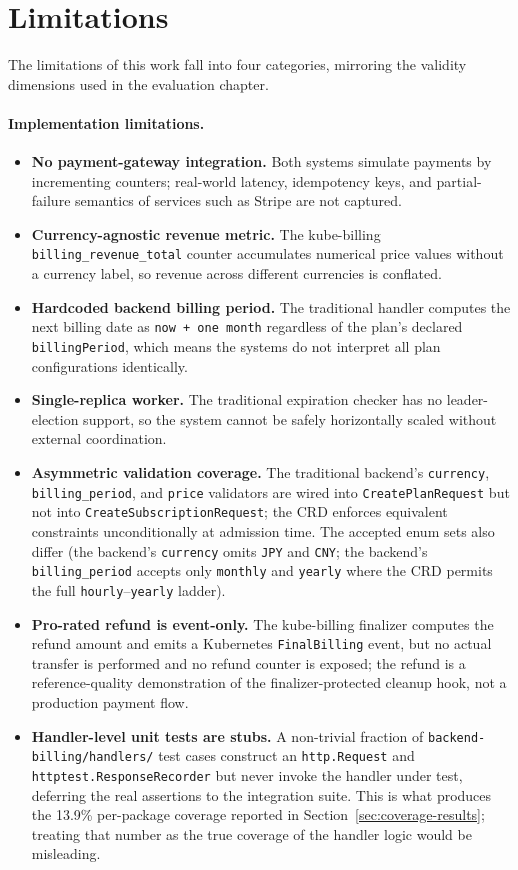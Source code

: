 \section{Limitations}\label{sec:limitations}

The limitations of this work fall into four categories, mirroring the validity dimensions used in the evaluation chapter.

\paragraph{Implementation limitations.}
\begin{itemize}
    \item \textbf{No payment-gateway integration.} Both systems simulate payments by incrementing counters; real-world latency, idempotency keys, and partial-failure semantics of services such as Stripe are not captured.
    \item \textbf{Currency-agnostic revenue metric.} The kube-billing \texttt{billing\_revenue\_total} counter accumulates numerical price values without a currency label, so revenue across different currencies is conflated.
    \item \textbf{Hardcoded backend billing period.} The traditional handler computes the next billing date as \texttt{now + one month} regardless of the plan's declared \texttt{billingPeriod}, which means the systems do not interpret all plan configurations identically.
    \item \textbf{Single-replica worker.} The traditional expiration checker has no leader-election support, so the system cannot be safely horizontally scaled without external coordination.
    \item \textbf{Asymmetric validation coverage.} The traditional backend's \texttt{currency}, \texttt{billing\_period}, and \texttt{price} validators are wired into \texttt{CreatePlanRequest} but not into \texttt{CreateSubscriptionRequest}; the CRD enforces equivalent constraints unconditionally at admission time. The accepted enum sets also differ (the backend's \texttt{currency} omits \texttt{JPY} and \texttt{CNY}; the backend's \texttt{billing\_period} accepts only \texttt{monthly} and \texttt{yearly} where the CRD permits the full \texttt{hourly}--\texttt{yearly} ladder).
    \item \textbf{Pro-rated refund is event-only.} The kube-billing finalizer computes the refund amount and emits a Kubernetes \texttt{FinalBilling} event, but no actual transfer is performed and no refund counter is exposed; the refund is a reference-quality demonstration of the finalizer-protected cleanup hook, not a production payment flow.
    \item \textbf{Handler-level unit tests are stubs.} A non-trivial fraction of \texttt{backend-billing/handlers/} test cases construct an \texttt{http.Request} and \texttt{httptest.ResponseRecorder} but never invoke the handler under test, deferring the real assertions to the integration suite. This is what produces the 13.9\% per-package coverage reported in Section~\ref{sec:coverage-results}; treating that number as the true coverage of the handler logic would be misleading.
\end{itemize}

